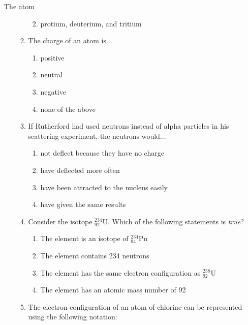 \begin{eocexercises}{The atom}
\begin{enumerate}[noitemsep, label=\textbf{\arabic*}. ]
\begin{enumerate}[noitemsep, label=\textbf{\alph*}. ]
\begin{enumerate}[noitemsep, label=\textbf{\roman*}. ]
\label{m38741*uid202}\item protium, deuterium, and tritium
\end{enumerate}
                \label{m38741*uid203}\item The charge of an atom is...
\label{m38741*id263355}\begin{enumerate}[noitemsep, label=\textbf{\roman*}. ] 
            \label{m38741*uid204}\item positive
\label{m38741*uid205}\item neutral
\label{m38741*uid206}\item negative
\item none of the above
\end{enumerate}
                \label{m38741*uid207}\item If Rutherford had used neutrons instead of alpha particles in his scattering experiment, the neutrons would...
\label{m38741*id263410}\begin{enumerate}[noitemsep, label=\textbf{\roman*}. ] 
            \label{m38741*uid208}\item not deflect because they have no charge
\label{m38741*uid209}\item have deflected more often
\label{m38741*uid210}\item have been attracted to the nucleus easily
\label{m38741*uid211}\item have given the same results
\end{enumerate}
                \label{m38741*uid212}\item Consider the isotope $_{92}^{234}\text{U}$. Which of the following statements is \textsl{true}?
\label{m38741*id263500}\begin{enumerate}[noitemsep, label=\textbf{\roman*}. ] 
            \label{m38741*uid213}\item The element is an isotope of $_{94}^{234}\text{Pu}$
\label{m38741*uid214}\item The element contains 234 neutrons
\label{m38741*uid215}\item The element has the same electron configuration as $_{92}^{238}\text{U}$
\label{m38741*uid216}\item The element has an atomic mass number of 92
\end{enumerate}
                \label{m38741*uid217}\item The electron configuration of an atom of chlorine can be represented using the following notation:

\end{enumerate}
\end{enumerate}
\end{eocexercises}
